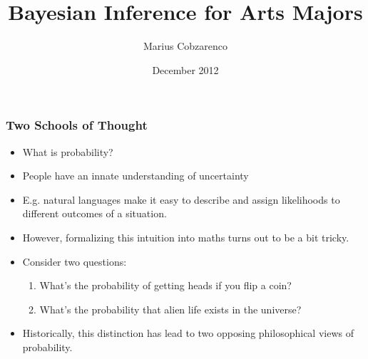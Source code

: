 \documentclass{beamer}
\title{Bayesian Inference for Arts Majors}
\author{Marius Cobzarenco}
\date{December 2012}
\begin{document}
	\maketitle
	\begin{frame}

		\frametitle{Two Schools of Thought}
		\begin{itemize}
			\item What is probability?
			\pause
			\item People have an innate understanding of uncertainty
			\pause
			\item E.g. natural languages make it easy to describe and assign likelihoods to different outcomes of a situation.
			\pause
			\item However, formalizing this intuition into maths turns out to be a bit tricky.
			\pause
			\item Consider two questions:
			\begin{enumerate}
				\item What's the probability of getting heads if you flip a coin?
				\pause
				\item What's the probability that alien life exists in the universe?
			\end{enumerate}
			\pause
			\item Historically, this distinction has lead to two opposing philosophical views of probability.
		\end{itemize}

	\end{frame}
\end{document}
